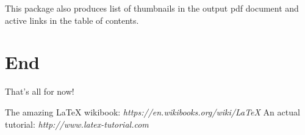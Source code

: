 \documentclass[12pt]{article}
\begin{document}
This package also produces list of thumbnails in the output pdf document and
active links in the table of contents.

\section{End}

That's all for now!

\begin{thebibliography}{1}
   The amazing \LaTeX{} wikibook: \emph{https://en.wikibooks.org/wiki/LaTeX}
   An actual tutorial: \emph{http://www.latex-tutorial.com}
\end{thebibliography}

\end{document}
